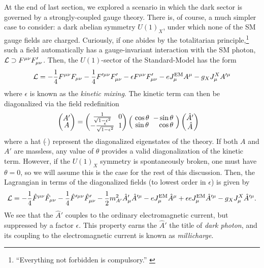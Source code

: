 {At the end of last section, we explored a scenario in which the dark sector is governed by a strongly-coupled gauge theory. There is, of course, a much simpler case to consider: a dark abelian symmetry $U(1)_X$, under which none of the SM gauge fields are charged. Curiously, if one abides by the totalitarian principle,\footnote{``Everything not forbidden is compulsory.'' \cite{kragh2019physicstotalitarianprinciple}}
 such a field automatically has a gauge-invariant interaction with the SM photon, ${\cal L}\supset F^{\mu\nu}F_{\mu\nu}'$. Then, the $U(1)$-sector of the Standard-Model has the form
\begin{align}
    {\cal L} = -\frac{1}{4}F^{\mu\nu}F_{\mu\nu} - \frac{1}{4}F'^{\mu\nu}F'_{\mu\nu} -\epsilon F^{\mu\nu}F_{\mu\nu}' - eJ_\mu^{\rm EM} A^{\mu} - g_XJ_\mu^X A'^\mu
\end{align}
where $\epsilon$ is known as the {\it kinetic mixing}. The kinetic term can then be diagonalized via the field redefinition
\begin{align}
    \setlength{\arraycolsep}{0.1cm}\renewcommand{\arraystretch}{0.8}\begin{pmatrix}A'\\ A\end{pmatrix} &= \setlength{\arraycolsep}{0.1cm}\renewcommand{\arraystretch}{0.8}\begin{pmatrix}\frac{1}{\sqrt{1-\epsilon^2}} & 0 \\ - \frac{\epsilon}{\sqrt{1-\epsilon^2}} & 1\end{pmatrix} \setlength{\arraycolsep}{0.1cm}\renewcommand{\arraystretch}{0.8}\begin{pmatrix}\ \cos{\theta} & -\sin{\theta} \ \\ \ \sin{\theta}& \ \ \, \cos{\theta} \ \end{pmatrix} \setlength{\arraycolsep}{0.1cm}\renewcommand{\arraystretch}{0.8}\begin{pmatrix}\hat{A}'\\ \hat{A}\end{pmatrix}
\end{align}
where a hat ($\hat{\ }$) represent the diagonalized eigenstates of the theory. If both $A$ and $A'$ are massless, any value of $\theta$ provides a valid diagonalization of the kinetic term. However, if the $U(1)_X$ symmetry is spontaneously broken, one must have $\theta = 0$, so we will assume this is the case for the rest of this discussion. Then, the Lagrangian in terms of the diagonalized fields (to lowest order in $\epsilon$) is given by
\begin{align}
    {\cal L} = -\frac{1}{4}\hat{F}^{\mu\nu}\hat{F}_{\mu\nu} - \frac{1}{4}\hat{F}'^{\mu\nu}\hat{F}'_{\mu\nu} - \frac{1}{2}m_{A'}^2\hat{A}'_\mu \hat{A}'^\mu - eJ_\mu^{\rm EM} \hat{A}^{\mu} + \epsilon e J_\mu^{\rm EM} \hat{A}'^\mu- g_XJ_\mu^X \hat{A}'^\mu.
\end{align}
We see that the $\hat{A}'$ couples to the ordinary electromagnetic current, but suppressed by a factor $\epsilon$. This property earns the $\hat{A}'$ the title of {\it dark photon}, and its coupling to the electromagnetic current is known as {\it millicharge}.

}
